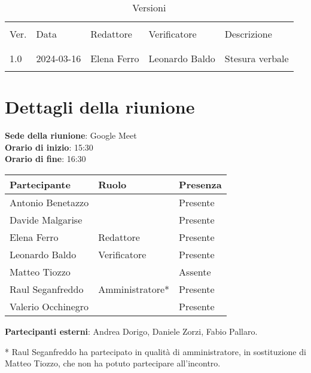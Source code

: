 \documentclass[italian,12pt]{article}
\begin{document}


\newpage



\begin{table}[!h]
	\caption{Versioni}
	\footnotesize
	\begin{center}
		\begin{tabular}{ l l l l p{6cm} }
			\hline                                                             \\[-2ex]
			Ver. & Data       & Redattore   & Verificatore   & Descrizione     \\
			\\[-2ex] \hline \\[-1.5ex]
			1.0  & 2024-03-16 & Elena Ferro & Leonardo Baldo & Stesura verbale \\
			\\[-1.5ex] \hline
		\end{tabular}
	\end{center}
\end{table}

\newpage

\tableofcontents

\newpage

\section{Dettagli della riunione}


\textbf{Sede della riunione}: Google Meet\\
\textbf{Orario di inizio}: 15:30\\
\textbf{Orario di fine}: 16:30\\

\begin{flushleft}
	\begin{table}[!h]
		\begin{tabular}{ |l|l|l| }
			\hline
			\textbf{Partecipante} & \textbf{Ruolo}  & \textbf{Presenza} \\
			\hline
			Antonio Benetazzo     &                 & Presente          \\
			Davide Malgarise      &                 & Presente          \\
			Elena Ferro           & Redattore       & Presente          \\
			Leonardo Baldo        & Verificatore    & Presente          \\
			Matteo Tiozzo         &                 & Assente           \\
			Raul Seganfreddo      & Amministratore* & Presente          \\
			Valerio Occhinegro    &                 & Presente          \\
			\hline
		\end{tabular}
	\end{table}
	\textbf{Partecipanti esterni}: Andrea Dorigo, Daniele Zorzi, Fabio Pallaro.\\
\end{flushleft}
* Raul Seganfreddo ha partecipato in qualità di amministratore, in sostituzione di Matteo Tiozzo, che non ha potuto partecipare all'incontro.
\end{document}
